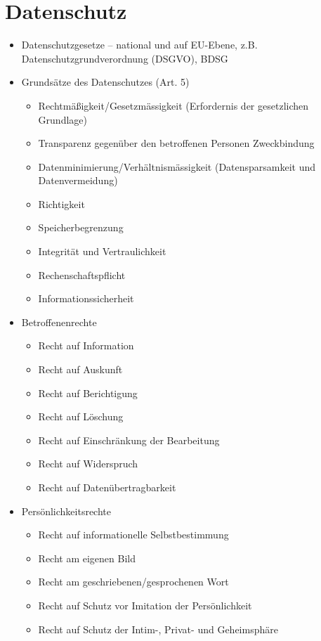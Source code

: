 \section{Datenschutz}
\label{sec:Datenschutz}

\begin{itemize}
	\item Datenschutzgesetze – national und auf EU-Ebene, z.B. Datenschutzgrundverordnung (DSGVO), BDSG
	\item Grundsätze des Datenschutzes (Art. 5)
	\begin{itemize}
		\item Rechtmäßigkeit/Gesetzmässigkeit (Erfordernis der gesetzlichen Grundlage)
		\item Transparenz gegenüber den betroffenen Personen
		Zweckbindung
		\item Datenminimierung/Verhältnismässigkeit (Datensparsamkeit und Datenvermeidung)
		\item Richtigkeit
		\item Speicherbegrenzung
		\item Integrität und Vertraulichkeit
		\item Rechenschaftspflicht
		\item Informationssicherheit
	\end{itemize}
	\item Betroffenenrechte
	\begin{itemize}
		\item Recht auf Information
		\item Recht auf Auskunft
		\item Recht auf Berichtigung
		\item Recht auf Löschung
		\item Recht auf Einschränkung der Bearbeitung
		\item Recht auf Widerspruch
		\item Recht auf Datenübertragbarkeit
	\end{itemize}
	\item Persönlichkeitsrechte
	\begin{itemize}
		\item Recht auf informationelle Selbstbestimmung
		\item Recht am eigenen Bild
		\item Recht am geschriebenen/gesprochenen Wort
		\item Recht auf Schutz vor Imitation der Persönlichkeit
		\item Recht auf Schutz der Intim-, Privat- und Geheimsphäre
	\end{itemize}
\end{itemize}